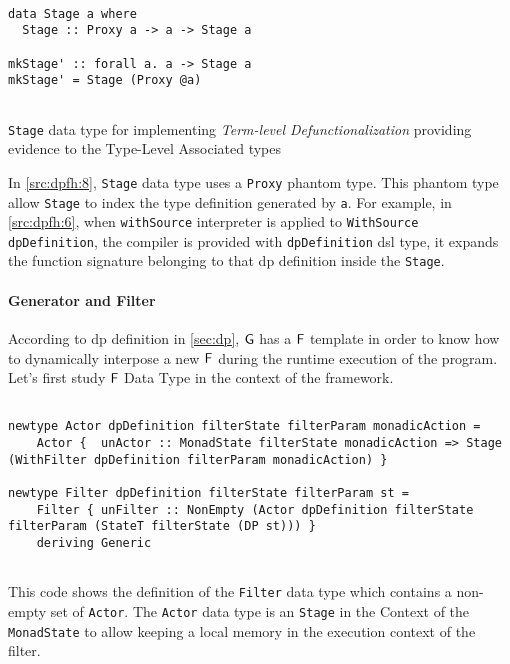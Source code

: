 \begin{listing}[H]
  \begin{verbatim}

data Stage a where
  Stage :: Proxy a -> a -> Stage a

mkStage' :: forall a. a -> Stage a
mkStage' = Stage (Proxy @a)
    
  \end{verbatim}
  \caption[{[\texttt{Stage.hs}] Stage Data Type}]{\texttt{Stage} data type for implementing \emph{Term-level Defunctionalization} providing evidence to the Type-Level Associated types}
  \label{src:dpfh:8}
\end{listing}

In \autoref{src:dpfh:8}, \texttt{Stage} data type uses a \texttt{Proxy} phantom type. 
This phantom type allow \texttt{Stage} to index the type definition generated by \texttt{a}.
For example, in \autoref{src:dpfh:6}, when \texttt{withSource} interpreter is applied to \texttt{WithSource dpDefinition},  
the compiler is provided with \texttt{dpDefinition} \acrshort{dsl} type, it expands the function signature belonging to that \acrshort{dp} definition inside the \texttt{Stage}.

\paragraph{Generator and Filter}
According to \acrshort{dp} definition in \autoref{sec:dp}, $\mathsf{G}$ has a $\mathsf{F}$ template in order to know how to dynamically interpose a new $\mathsf{F}$ during the runtime execution of the program.
Let's first study $\mathsf{F}$ Data Type in the context of the framework.

\begin{listing}[H]
  \begin{verbatim}

newtype Actor dpDefinition filterState filterParam monadicAction =
    Actor {  unActor :: MonadState filterState monadicAction => Stage (WithFilter dpDefinition filterParam monadicAction) }

newtype Filter dpDefinition filterState filterParam st =
    Filter { unFilter :: NonEmpty (Actor dpDefinition filterState filterParam (StateT filterState (DP st))) }
    deriving Generic
    
  \end{verbatim}
  \caption[{[\texttt{Stage.hs}] Filter / Actor Data Type}]{This code shows the definition of the \texttt{Filter} data type which contains a non-empty set of \texttt{Actor}. The \texttt{Actor} data type is an \texttt{Stage} in the Context of the \texttt{MonadState} to allow keeping a local memory in the execution context of the filter.}
  \label{src:dpfh:9}
\end{listing}

